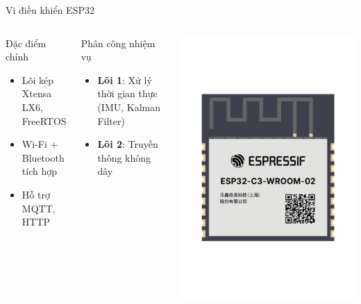 \begin{frame}{Vi điều khiển ESP32}
\begin{columns}
\begin{block}{Đặc điểm chính}
\begin{itemize}
\item Lõi kép Xtensa LX6, FreeRTOS
\item Wi-Fi + Bluetooth tích hợp
\item Hỗ trợ MQTT, HTTP
\end{itemize}
\end{block}

\begin{block}{Phân công nhiệm vụ}
\begin{itemize}
\item \textbf{Lõi 1}: Xử lý thời gian thực (IMU, Kalman Filter)
\item \textbf{Lõi 2}: Truyền thông không dây
\end{itemize}
\end{block}

\begin{center}
    \includegraphics[width=\linewidth]{images/esp32_c3.png}
\end{center}
\end{columns}
\end{frame}

